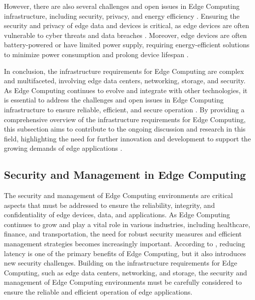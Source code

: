 \documentclass[11pt,a4paper]{article}
\begin{document}
However, there are also several challenges and open issues in Edge Computing infrastructure, including security, privacy, and energy efficiency \cite{arxiv:1911.11966}. Ensuring the security and privacy of edge data and devices is critical, as edge devices are often vulnerable to cyber threats and data breaches \cite{arxiv:2107.13374}. Moreover, edge devices are often battery-powered or have limited power supply, requiring energy-efficient solutions to minimize power consumption and prolong device lifespan \cite{arxiv:2209.14141}.

In conclusion, the infrastructure requirements for Edge Computing are complex and multifaceted, involving edge data centers, networking, storage, and security. As Edge Computing continues to evolve and integrate with other technologies, it is essential to address the challenges and open issues in Edge Computing infrastructure to ensure reliable, efficient, and secure operation \cite{arxiv:2309.03420}. By providing a comprehensive overview of the infrastructure requirements for Edge Computing, this subsection aims to contribute to the ongoing discussion and research in this field, highlighting the need for further innovation and development to support the growing demands of edge applications \cite{arxiv:2405.04824}.


\subsection{Security and Management in Edge Computing}


The security and management of Edge Computing environments are critical aspects that must be addressed to ensure the reliability, integrity, and confidentiality of edge devices, data, and applications. As Edge Computing continues to grow and play a vital role in various industries, including healthcare, finance, and transportation, the need for robust security measures and efficient management strategies becomes increasingly important. According to \cite{arxiv:2111.10076}, reducing latency is one of the primary benefits of Edge Computing, but it also introduces new security challenges. Building on the infrastructure requirements for Edge Computing, such as edge data centers, networking, and storage, the security and management of Edge Computing environments must be carefully considered to ensure the reliable and efficient operation of edge applications.
\end{document}
